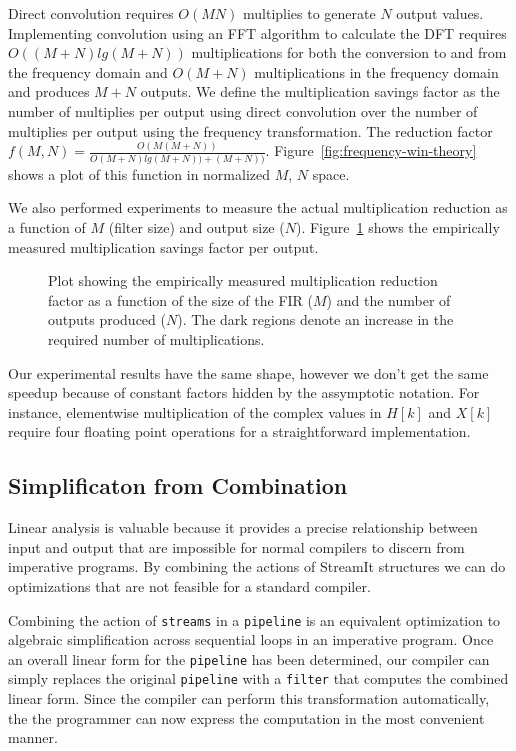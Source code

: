 Direct convolution requires $O(MN)$ multiplies to generate $N$ output values. 
Implementing convolution using an FFT algorithm to calculate the DFT requires 
$O((M+N)lg(M+N))$ multiplications for both the conversion to and from the frequency domain
and $O(M+N)$ multiplications in the frequency domain and produces $M+N$ outputs.
We define the multiplication savings factor as the number of multiplies per output
using direct convolution over the number of multiplies per output using the 
frequency transformation. The reduction factor 
$f(M,N)=\frac{O(M(M+N))}{O(M+N)lg(M+N))+(M+N))}$.
Figure~\ref{fig:frequency-win-theory} shows a plot of this function in normalized 
$M$, $N$ space.

We also performed experiments to measure the actual multiplication reduction
as a function of $M$ (filter size) and output size ($N$).
Figure~\ref{fig:frequency-win-empirical} shows the empirically measured
multiplication savings factor per output.

\begin{figure}
\center
\epsfxsize=3.2in
\caption{Plot showing the empirically measured multiplication reduction factor as a function of the size of the FIR ($M$) and the number of outputs produced ($N$). The dark regions denote an increase in the required number of multiplications.}
\label{fig:frequency-win-empirical}
\vspace{-12pt}
\end{figure}

Our experimental results have the same shape, however we don't get the same
speedup because of constant factors hidden by the assymptotic notation. For instance,
elementwise multiplication of the complex values in $H[k]$ and $X[k]$ require
four floating point operations for a straightforward implementation.



\subsection{Simplificaton from Combination}
Linear analysis is valuable because it provides a precise relationship between input and output   
that are impossible for normal compilers to discern from imperative programs. By 
combining the actions of StreamIt structures we can do optimizations that are 
not feasible for a standard compiler.

Combining the action of {\tt streams} in a {\tt pipeline} is an equivalent optimization 
to algebraic simplification across sequential loops in an imperative program.
Once an overall linear form for the {\tt pipeline} has been determined, our compiler 
can simply replaces the original {\tt pipeline} with a {\tt filter} that computes the 
combined linear form. Since the compiler can perform this transformation automatically,
the the programmer can now express the computation in the most convenient manner. 

